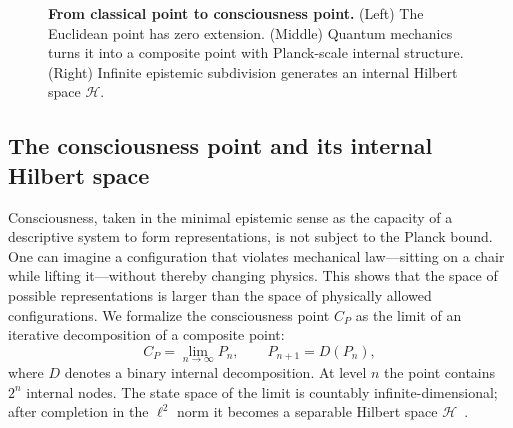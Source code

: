 \documentclass[11pt,a4paper]{article}
\theoremstyle{plain}
\begin{document}
\begin{figure}[htbp]
\centering
{}
\caption{\textbf{From classical point to consciousness point.} (Left) The Euclidean point has zero extension. (Middle) Quantum mechanics turns it into a composite point with Planck-scale internal structure. (Right) Infinite epistemic subdivision generates an internal Hilbert space $\mathcal{H}$.}
\label{fig:point}
\end{figure}

\subsection{The consciousness point and its internal Hilbert space}

Consciousness, taken in the minimal epistemic sense as the capacity of a descriptive system to form representations, is not subject to the Planck bound. One can imagine a configuration that violates mechanical law---sitting on a chair while lifting it---without thereby changing physics. This shows that the space of possible representations is larger than the space of physically allowed configurations. We formalize the consciousness point $C_P$ as the limit of an iterative decomposition of a composite point:
\begin{equation}\label{eq:consciousness}
C_P=\lim_{n\to\infty}P_n,\qquad P_{n+1}=D(P_n),
\end{equation}
where $D$ denotes a binary internal decomposition. At level $n$ the point contains $2^n$ internal nodes. The state space of the limit is countably infinite-dimensional; after completion in the $\ell^2$ norm it becomes a separable Hilbert space $\mathcal{H}$~\cite{neumann1932,dirac1930}.
\end{document}
